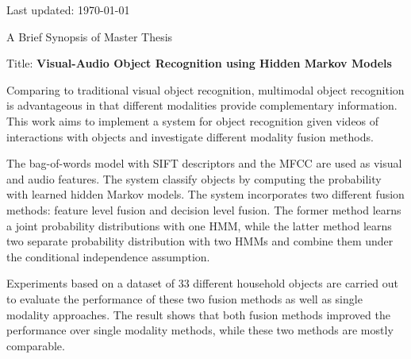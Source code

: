 \documentclass[a4paper,11pt]{article} %
\begin{document}
\vspace{.5cm}
\par{\centering \scriptsize Last updated: \today \par}

\newpage

\par{\centering \Large \hypertarget{synopsis}{A Brief Synopsis of Master Thesis}\par}

Title: \textbf{Visual-Audio Object Recognition using Hidden Markov Models}

Comparing to traditional visual object recognition, multimodal object recognition is advantageous in that different modalities provide complementary information. This work aims to implement a system for object recognition given videos of interactions with objects and investigate different modality fusion methods.

The bag-of-words model with SIFT descriptors and the MFCC are used as visual and audio features. The system classify objects by computing the probability with learned hidden Markov models. The system incorporates two different fusion methods: feature level fusion and decision level fusion. The former method learns a joint probability distributions with one HMM, while the latter method learns two separate probability distribution with two HMMs and combine them under the conditional independence assumption.

Experiments based on a dataset of 33 different household objects are carried out to evaluate the performance of these two fusion methods as well as single modality approaches. The result shows that both fusion methods improved the performance over single modality methods, while these two methods are mostly comparable. 
 
\end{document}
